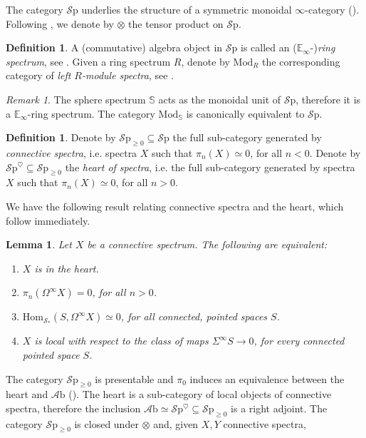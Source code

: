 \documentclass[10pt]{amsart}
\newcommand{\bE}{\mathbb{E}}
\newcommand{\s}{\mathscr{S}}
\newcommand{\bS}{\mathbb{S}}
\newcommand{\Hom}{\mathrm{Hom}}
\newcommand{\Sp}{\mathscr{S}\mathrm{p}}
\newcommand{\Mod}{\mathrm{Mod}}
\newcommand{\Ab}{\mathscr{A}\mathrm{b}}
\newtheorem{lemma}[equation]{Lemma}
\theoremstyle{definition}
\newtheorem{definition}[equation]{Definition}
\theoremstyle{remark}
\newtheorem{remark}[equation]{Remark}
\numberwithin{equation}{section}
\begin{document}
  The category $\Sp$ underlies the structure of a symmetric monoidal $\infty$-category (\cite[Corollary 4.8.2.19]{lurie2017ha}). Following \cite{lurie2017ha}, we denote by $\otimes$ the tensor product on $\Sp$.
  \begin{definition}
    A (commutative) algebra object in $\Sp$ is called an ($\bE_\infty$-)\emph{ring spectrum}, see \cite[Definition 7.1.0.1]{lurie2017ha}. Given a ring spectrum $R$, denote by $\Mod_R$ the corresponding category of \emph{left $R$-module spectra}, see \cite[Definition 7.1.1.2]{lurie2017ha}. 
  \end{definition}
  \begin{remark}
    The sphere spectrum $\bS$ acts as the monoidal unit of $\Sp$, therefore it is a $\bE_\infty$-ring spectrum. The category $\Mod_{\bS}$ is canonically equivalent to $\Sp$. 
  \end{remark}
    \begin{definition}
    Denote by $\Sp_{\geq0}\subseteq\Sp$ the full sub-category generated by \emph{connective spectra}, i.e. spectra $X$ such that $\pi_n(X)\simeq0$, for all $n<0$. Denote by $\Sp^\heartsuit\subseteq\Sp_{\geq0}$ the \emph{heart of spectra}, i.e. the full sub-category generated by spectra $X$ such that $\pi_n(X)\simeq0$, for all $n>0$.
  \end{definition}
  We have the following result relating connective spectra and the heart, which follow immediately.
  \begin{lemma}
  Let $X$ be a connective spectrum. The following are equivalent:
  \begin{enumerate}
    \item $X$ is in the heart. 
    \item $\pi_n(\Omega^\infty X)=0$, for all $n>0$.
    \item $\Hom_{\s_*}(S,\Omega^\infty X)\simeq0$, for all connected, pointed spaces $S$.
    \item $X$ is local with respect to the class of maps $\Sigma^\infty S\to0$, for every connected pointed space $S$.
  \end{enumerate}
  \end{lemma}

  The category $\Sp_{\geq0}$ is presentable and $\pi_0$ induces an equivalence between the heart and $\Ab$ (\cite[Proposition 1.4.3.6]{lurie2017ha}). The heart is a sub-category of local objects of connective spectra, therefore the inclusion $\Ab\simeq\Sp^\heartsuit\subseteq\Sp_{\geq0}$ is a right adjoint. The category $\Sp_{\geq0}$ is closed under $\otimes$ and, given $X,Y$ connective spectra, 
\end{document}
